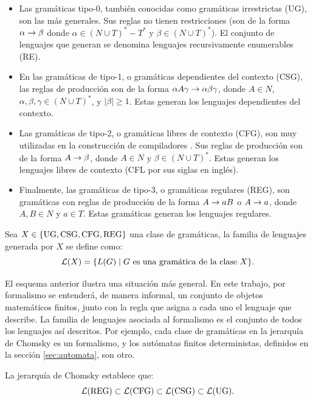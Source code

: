 \begin{itemize}
	\item Las gramáticas tipo-0, también conocidas como gramáticas irrestrictas (UG), son las más generales. Sus reglas no tienen restricciones (son de la forma $\alpha \rightarrow \beta$ donde $\alpha \in (N \cup T)^* - T^*$ y $\beta \in (N \cup T)^*$). El conjunto de lenguajes que generan se denomina lenguajes recursivamente enumerables (RE).

	\item En las gramáticas de tipo-1, o gramáticas dependientes del contexto (CSG), las reglas de producción son de la forma $\alpha A \gamma \rightarrow \alpha \beta \gamma$, donde $A \in N$, $\alpha, \beta, \gamma \in (N \cup T)^*$, y $|\beta| \geq 1$. Estas generan los lenguajes dependientes del contexto.

	\item Las gramáticas de tipo-2, o gramáticas libres de contexto (CFG), son muy utilizadas en la construcción de compiladores \cite{automataTheory}. Sus reglas de producción son de la forma $A \rightarrow \beta$, donde $A \in N$ y $\beta \in (N \cup T)^*$. Estas generan los lenguajes libres de contexto (CFL por sus siglas en inglés).

	\item Finalmente, las gramáticas de tipo-3, o gramáticas regulares (REG), son gramáticas con reglas de producción de la forma $A \rightarrow aB$ o $A \rightarrow a$, donde $A, B \in N$ y $a \in T$. Estas gramáticas generan los lenguajes regulares.
\end{itemize}

\begin{definition}
	Sea $X \in \{\text{UG}, \text{CSG}, \text{CFG}, \text{REG}\}$ una clase de gramáticas, la familia de lenguajes generada por $X$ se define como:
	$$
		\mathcal{L}(X) = \{L(G) \;|\; G \text{ es una gramática de la clase } X\}.
	$$
\end{definition}

El esquema anterior ilustra una situación más general. En este trabajo, por \lquoti formalismo\rquoti\; se entenderá, de manera informal, un conjunto de objetos matemáticos finitos, junto con la regla que asigna a cada uno el lenguaje que describe. La familia de lenguajes asociada al formalismo es el conjunto de todos los lenguajes así descritos. Por ejemplo, cada clase de gramáticas en la jerarquía de Chomsky es un formalismo, y los autómatas finitos deterministas, definidos en la sección \ref{sec:automata}, son otro.

La jerarquía de Chomsky establece que:
$$
	\mathcal{L}(\text{REG}) \subset \mathcal{L}(\text{CFG}) \subset \mathcal{L}(\text{CSG}) \subset \mathcal{L}(\text{UG}).
$$

